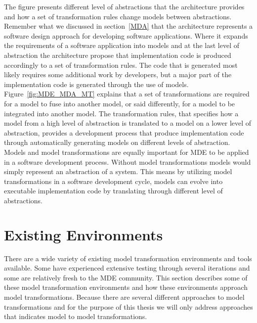 The figure presents different level of abstractions that the architecture
provides and how a set of transformation rules change models between
abstractions. Remember what we discussed in section~\ref{MDA} that the
architecture represents a software design approach for developing software
applications. Where it expands the requirements of a software application into
models and at the last level of abstraction the architecture propose that
implementation code is produced accordingly to a set of transformation rules.
The code that is generated most likely requires some additional work by developers, but a major part of the
implementation code is generated through the use of models.
Figure~\ref{fig:MDE_MDA_MT} explains that a set of transformations are required
for a model to fuse into another model, or said differently, for a model to be
integrated into another model. The transformation rules, that specifies how a model from
a high level of abstraction is translated to a model on a lower level of
abstraction, provides a development process that produce implementation code
through automatically generating models on different levels of abstraction.
Models and model transformations are equally important for MDE to be applied in
a software development process. Without model transformations models would
simply represent an abstraction of a system. This means by utilizing model
transformations in a software development cycle, models can evolve into
executable implementation code by translating through different level of
abstractions. 

\section{Existing Environments}
\label{tooling}

There are a wide variety of existing model transformation environments and
tools available. Some have experienced extensive testing through several
iterations and some are relatively fresh to the MDE community. This section
describes some of these model transformation environments and how these
environments approach model transformations. Because there are several different
approaches to model transformations and for the purpose of this thesis we will
only address approaches that indicates model to model transformations. 

